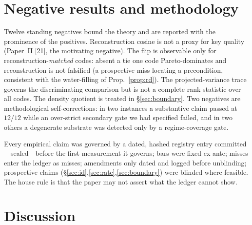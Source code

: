 \documentclass[lettersize,onecolumn]{IEEEtran}
\theoremstyle{definition}
\theoremstyle{remark}
\begin{document}
\section{Negative results and methodology}\label{sec:negatives}

Twelve standing negatives bound the theory and are reported with the prominence of
the positives. Reconstruction cosine is not a proxy for key quality (Paper~II
[21], the motivating negative). The flip is observable only for
reconstruction-\emph{matched} codes: absent a tie one code Pareto-dominates and
reconstruction is not falsified (a prospective miss locating a precondition,
consistent with the water-filling of Prop.~\ref{prop:rd}). The projected-variance
trace governs the discriminating comparison but is not a complete rank statistic over
all codes. The density quotient is treated in \S\ref{sec:boundary}. Two negatives are
methodological self-corrections: in two instances a substantive claim passed at
$12/12$ while an over-strict secondary gate we had specified failed, and in two others
a degenerate substrate was detected only by a regime-coverage gate.

Every empirical claim was governed by a dated, hashed registry entry
committed---sealed---before the first measurement it governs; bars were fixed ex
ante; misses enter the ledger as misses; amendments only dated and logged before
unblinding; prospective claims (\S\ref{sec:id},\ref{sec:rate},\ref{sec:boundary}) were
blinded where feasible. The house rule is that the paper may not assert what the
ledger cannot show.

\section{Discussion}\label{sec:discussion}
\end{document}
